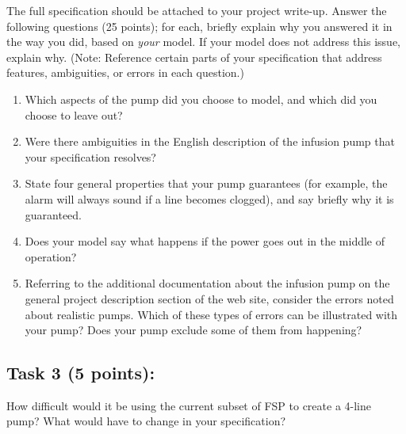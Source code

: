 \documentclass{article}
\newcommand{\head}{\subsection*}
\begin{document}
\noindent The full specification should be attached to your project
write-up. Answer the following questions (25 points); for each,
briefly explain why you answered it in the way you did, based on
\emph{your} model. If your model does not address this issue,
explain why. (Note: Reference certain parts of your specification that address features, ambiguities, or errors in each question.)

\begin{enumerate}
    \item Which aspects of the pump did you choose to model, and which did you choose to leave out?
    \item Were there ambiguities in the English description of the infusion pump that your specification resolves?
    \item State four general properties that your pump guarantees (for example, the alarm will always sound if a line becomes clogged), and say briefly why it is guaranteed.
    \item Does your model say what happens if the power goes out in the middle of operation?
    \item Referring to the additional documentation about the infusion pump on the general project description section of the web site, consider the errors noted about realistic pumps. Which of these types of errors can be illustrated with your pump? Does your pump exclude some of them from happening?

\end{enumerate}


\head{Task 3 (5 points):}


How difficult would it be using the current subset of FSP to create
a 4-line pump? What would have to change in your specification?
\end{document}
